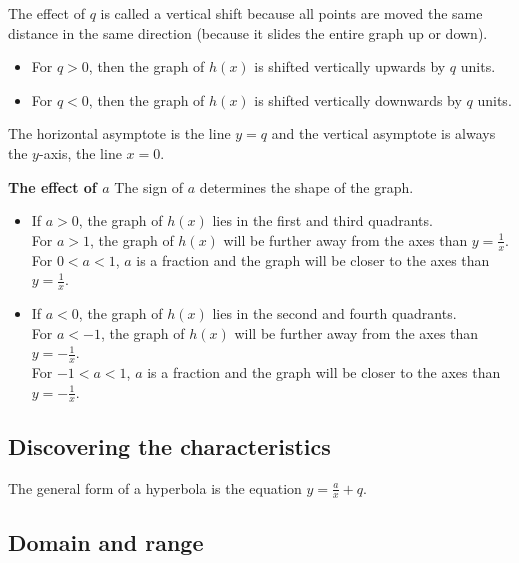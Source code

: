 The effect of $q$ is called a vertical shift because all points are moved the same distance in the same direction (because it slides the entire graph up or down). 
\begin{itemize}
\item For $q>0$, then the graph of $h(x)$ is shifted vertically upwards by $q$ units. 
\item For $q<0$, then the graph of $h(x)$ is shifted vertically downwards by $q$ units.
\end{itemize}
The horizontal asymptote is the line $y=q$ and the vertical asymptote is always the $y$-axis, the line $x=0$.\par
\vspace{8pt}
\textbf{The effect of $a$}\newline
The sign of $a$ determines the shape of the graph. 
\begin{itemize}
 \item If $a>0$, the graph of $h(x)$ lies in the first and third quadrants. \\
For $a>1$, the graph of $h(x)$ will be further away from the axes than $y=\frac{1}{x}$.
\\For $0<a<1$, $a$ is a fraction and the graph will be closer to the axes than $y=\frac{1}{x}$. 
\item If $a<0$, the graph of $h(x)$ lies in the second and fourth quadrants.\\
For $a<-1$, the graph of $h(x)$ will be further away from the axes than $y=-\frac{1}{x}$.
\\For $-1<a<1$, $a$ is a fraction and the graph will be closer to the axes than $y=-\frac{1}{x}$. 
\end{itemize}



\subsection*{Discovering the characteristics}  
The general form of a hyperbola is the equation $y=\frac{a}{x}+q$.

\subsection*{Domain and range}

